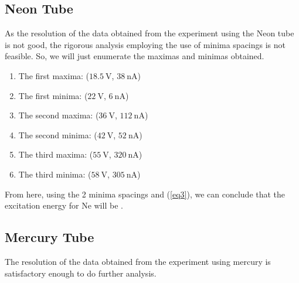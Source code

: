 \documentclass[%
 reprint,
 amsmath,amssymb,
 aps,
]{revtex4-2}
\begin{document}
    \subsection{Neon Tube}
        As the resolution of the data obtained from the experiment using the Neon tube is not good, the rigorous analysis employing the use of minima spacings is not feasible. So, we will just enumerate the maximas and minimas obtained. 
        \begin{enumerate}
            \item The first maxima: ($\SI{18.5}{\volt}$, $\SI{38}{\nano \ampere}$)
            \item The first minima: ($\SI{22}{\volt}$, $\SI{6}{\nano \ampere}$)
            \item The second maxima: ($\SI{36}{\volt}$, $\SI{112}{\nano \ampere}$)
            \item The second minima: ($\SI{42}{\volt}$, $\SI{52}{\nano \ampere}$)
            \item The third maxima: ($\SI{55}{\volt}$, $\SI{320}{\nano \ampere}$)
            \item The third minima: ($\SI{58}{\volt}$, $\SI{305}{\nano \ampere}$)
        \end{enumerate}
        From here, using the 2 minima spacings and (\ref{eq3}), we can conclude that the excitation energy for Ne will be .
    \subsection{Mercury Tube}
        The resolution of the data obtained from the experiment using mercury is satisfactory enough to do further analysis.
\end{document}
